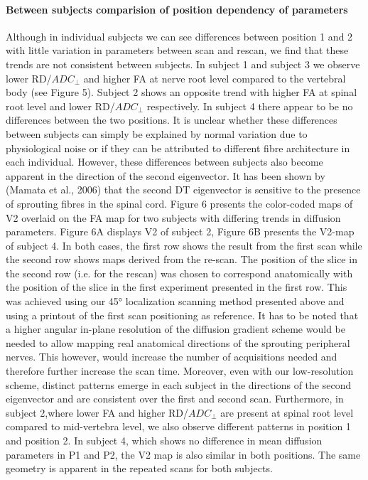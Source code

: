 \paragraph{Between subjects comparision of position dependency of parameters}
Although in individual subjects we can see differences between position 1 and 2 with little variation in parameters between scan and rescan, we find that these trends are not consistent between subjects. In subject 1 and subject 3 we observe lower RD/$ADC_\perp$ and higher FA at nerve root level compared to the vertebral body (see Figure 5). Subject 2 shows an opposite trend with higher FA at spinal root level and lower RD/$ADC_\perp$ respectively. In subject 4 there appear to be no differences between the two positions. It is unclear whether these differences between subjects can simply be explained by normal variation due to physiological noise or if they can be attributed to different fibre architecture in each individual. However, these differences between subjects also become apparent in the direction of the second eigenvector. It has been shown by (Mamata et al., 2006) that the second DT eigenvector is sensitive to the presence of sprouting fibres in the spinal cord. Figure 6 presents the color-coded maps of V2 overlaid on the FA map for two subjects with differing trends in diffusion parameters. Figure 6A displays V2 of subject 2, Figure 6B presents the V2-map of subject 4. In both cases, the first row shows the result from the first scan while the second row shows maps derived from the re-scan. The position of the slice in the second row (i.e. for the rescan) was chosen to correspond anatomically with the position of the slice in the first experiment presented in the first row. This was achieved using our 45° localization scanning method presented above and using a printout of the first scan positioning as reference. It has to be noted that a higher angular in-plane resolution of the diffusion gradient scheme would be needed to allow mapping real anatomical directions of the sprouting peripheral nerves. This however, would increase the number of acquisitions needed and therefore further increase the scan time. Moreover, even with our low-resolution scheme, distinct patterns emerge in each subject in the directions of the second eigenvector and are consistent over the first and second scan. Furthermore, in subject 2,where lower FA and higher RD/$ADC_\perp$ are present at spinal root level compared to mid-vertebra level, we also observe different patterns in position 1 and position 2. In subject 4, which shows no difference in mean diffusion parameters in P1 and P2, the V2 map is also similar in both positions. The same geometry is apparent in the repeated scans for both subjects.

